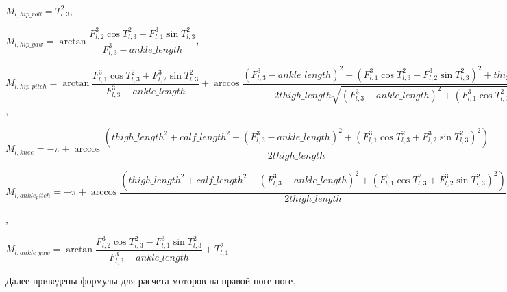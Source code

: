 \begin{center}
$M_{l,hip\_roll} = T^{2}_{l,3}$,

$M_{l,hip\_yaw} = \arctan \dfrac{F^{3}_{l,2} \cos T^{2}_{l,3} - F^{3}_{l,1} \sin T^{2}_{l,3}}{F^{3}_{l,3} - ankle\_length}$,

$M_{l,hip\_pitch} = \arctan \dfrac{  F^{3}_{l,1} \cos T^{2}_{l,3} + F^{3}_{l,2} \sin T^{2}_{l,3}  }{  F^{3}_{l,3} - ankle\_length  } + \arccos \dfrac{  (F^{3}_{l,3} - ankle\_length)^{2} + (F^{3}_{l,1} \cos T^{2}_{l,3} + F^{3}_{l,2} \sin T^{2}_{l,3}) ^ {2}  + thigh\_length^{2} - calf\_length ^ 2 }{ 2 thigh\_length \sqrt{(F^{3}_{l,3} - ankle\_length)^{2} + (F^{3}_{l,1} \cos T^{2}_{l,3} + F^{3}_{l,2} \sin T^{2}_{l,3}) ^ {2}}}$,

$M_{l,knee} = -\pi + \arccos \dfrac{(thigh\_length ^ {2} + calf\_length ^ {2} - (F^{3}_{l,3} - ankle\_length)^{2} + (F^{3}_{l,1} \cos T^{2}_{l,3} + F^{3}_{l,2} \sin T^{2}_{l,3}) ^ {2})} {2 thigh\_length} $

$M_{l,ankle_pitch} = -\pi + \arccos \dfrac{(thigh\_length ^ {2} + calf\_length ^ {2} - (F^{3}_{l,3} - ankle\_length)^{2} + (F^{3}_{l,1} \cos T^{2}_{l,3} + F^{3}_{l,2} \sin T^{2}_{l,3}) ^ {2})} {2 thigh\_length} + \arctan \dfrac{  F^{3}_{l,1} \cos T^{2}_{l,3} + F^{3}_{l,2} \sin T^{2}_{l,3}  }{  F^{3}_{l,3} - ankle\_length  } + \arccos \dfrac{  (F^{3}_{l,3} - ankle\_length)^{2} + (F^{3}_{l,1} \cos T^{2}_{l,3} + F^{3}_{l,2} \sin T^{2}_{l,3}) ^ {2}  + thigh\_length^{2} - calf\_length ^ 2 }{ 2 thigh\_length \sqrt{(F^{3}_{l,3} - ankle\_length)^{2} + (F^{3}_{l,1} \cos T^{2}_{l,3} + F^{3}_{l,2} \sin T^{2}_{l,3}) ^ {2}}} - T^{2}_{l,2}$,

$M_{l,ankle\_yaw} = \arctan \dfrac{F^{3}_{l,2} \cos T^{2}_{l,3} - F^{3}_{l,1} \sin T^{2}_{l,3}}{F^{3}_{l,3} - ankle\_length} + T^{2}_{l,1}$
\end{center}

Далее приведены формулы для расчета моторов на правой ноге ноге.

